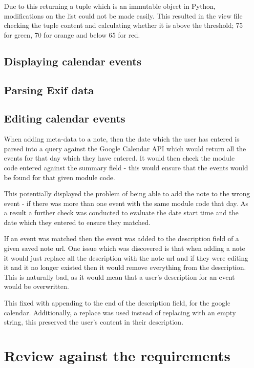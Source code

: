 Due to this returning a tuple which is an immutable object in Python, modifications on the list could not be made easily. This resulted in the view file checking the tuple content and calculating whether it is above the threshold; 75 for green, 70 for orange and below 65 for red.

\subsection{Displaying calendar events}

\subsection{Parsing Exif data}

\subsection{Editing calendar events}
When adding meta-data to a note, then the date which the user has entered is parsed into a query against the Google Calendar API which would return all the events for that day which they have entered. It would then check the module code entered against the summary field - this would ensure that the events would be found for that given module code.

This potentially displayed the problem of being able to add the note to the wrong event - if there was more than one event with the same module code that day. As a result a further check was conducted to evaluate the date start time and the date which they entered to ensure they matched.

If an event was matched then the event was added to the description field of a given saved note url. One issue which was discovered is that when adding a note it would just replace all the description with the note url and if they were editing it and it no longer existed then it would remove everything from the description. This is naturally bad, as it would mean that a user's description for an event would be overwritten.

This fixed with appending to the end of the description field, for the google calendar. Additionally, a replace was used instead of replacing with an empty string, this preserved the user's content in their description.



\section{Review against the requirements}
